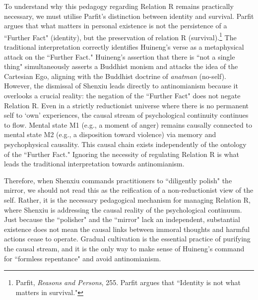 To understand why this pedagogy regarding Relation R remains practically
necessary, we must utilise Parfit's distinction between identity and
survival. Parfit argues that what matters in personal existence is not
the persistence of a ``Further Fact" (identity), but the preservation of
relation R (survival).\footnote{Parfit, \emph{Reasons and Persons}, 255.
  Parfit argues that ``Identity is not what matters in survival."} The
traditional interpretation correctly identifies Huineng's verse as a
metaphysical attack on the ``Further Fact." Huineng's assertion that
there is ``not a single thing" simultaneously asserts a Buddhist monism
and attacks the idea of the Cartesian Ego, aligning with the Buddhist
doctrine of \emph{anatman} (no-self). However, the dismissal of Shenxiu
leads directly to antinomianism because it overlooks a crucial reality:
the negation of the ``Further Fact" does not negate Relation R. Even in a
strictly reductionist universe where there is no permanent self to `own'
experiences, the causal stream of psychological continuity continues to
flow. Mental state M1 (e.g., a moment of anger) remains causally
connected to mental state M2 (e.g., a disposition toward violence) via
memory and psychophysical causality. This causal chain exists
independently of the ontology of the ``Further Fact." Ignoring the
necessity of regulating Relation R is what leads the traditional
interpretation towards antinomianism.

Therefore, when Shenxiu commands practitioners to ``diligently polish"
the mirror, we should not read this as the reification of a
non-reductionist view of the self. Rather, it is the necessary
pedagogical mechanism for managing Relation R, where Shenxiu is
addressing the causal reality of the psychological continuum. Just
because the ``polisher" and the ``mirror" lack an independent, substantial
existence does not mean the causal links between immoral thoughts and
harmful actions cease to operate. Gradual cultivation is the essential
practice of purifying the causal stream, and it is the only way to make
sense of Huineng's command for ``formless repentance" and avoid
antinomianism.

